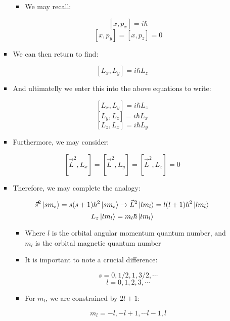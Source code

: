 \begin{itemize}
\begin{itemize}
\begin{itemize}
            \begin{itemize}

              \item We may recall:

                $$[x,p_x]=i\hbar$$
                $$[x,p_y]=[x,p_z]=0$$

            \end{itemize}

          \item We can then return to find:

            $$[L_x,L_y]=i\hbar L_z$$

          \item And ultimatelly we enter this into the above equations to write:

            $$[L_x,L_y]=i\hbar L_z$$
            $$[L_y,L_z]=i\hbar L_x$$
            $$[L_z,L_x]=i\hbar L_y$$

          \item Furthermore, we may consider:

            $$[\vec{L}^2,L_x]=[\vec{L}^2,L_y]=[\vec{L}^2,L_z]=0$$

          \item Therefore, we may complete the analogy:

            $$\vec{s}^2\ket{sm_s}=s(s+1)\hbar^2\ket{sm_s}\to\vec{L}^2\ket{lm_l}=l(l+1)\hbar^2\ket{lm_l}$$
            $$L_z\ket{lm_l}=m_l\hbar\ket{lm_l}$$

            \begin{itemize}

              \item Where $l$ is the orbital angular momentum quantum number, and $m_l$ is the orbital magnetic quantum number

              \item It is important to note a crucial difference:

                $$s=0,1/2,1,3/2,\cdots$$
                $$l=0,1,2,3,\cdots$$
            
              \item For $m_l$, we are constrained by $2l+1$:

                $$m_l=-l,-l+1,\cdots l-1, l$$

            \end{itemize}

        \end{itemize}

    \end{itemize}


\end{itemize}
